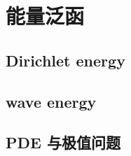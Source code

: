 \section{能量泛函}
\label{b2:sec:1403}


\subsection{Dirichlet energy}
\label{b2:subsec:140301}

\subsection{wave energy}
\label{b2:subsec:140302}

\subsection{PDE 与极值问题}
\label{b2:subsec:140303}


